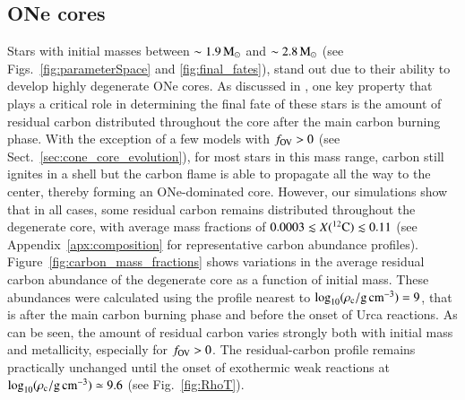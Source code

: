 \documentclass[main.tex]{subfiles}
\begin{document}
\subsection{ONe cores}\label{sec:one_core_evolution}
Stars with initial masses between $\sim 1.9\msun$ and $\sim  2.8\msun$ (see Figs.~\ref{fig:parameterSpace} and \ref{fig:final_fates}),  stand out due to their ability to develop highly degenerate ONe cores. As discussed in , one key property that  plays a critical role in determining the final fate of these stars is the amount of residual carbon distributed throughout the core  after the main carbon burning phase. 
With the exception of a few models with $f_{\rm OV}> 0$ (see Sect.~\ref{sec:cone_core_evolution}), for  most stars in this mass range, carbon still ignites  in a shell but the carbon flame
is able to propagate all the way to the center, thereby forming an ONe-dominated core. 
However, our simulations show that in all cases, some residual carbon remains
distributed throughout the degenerate core, with average mass fractions of $0.0003 \lesssim X(\iso{C}{12}) \lesssim 0.11$ (see Appendix~\ref{apx:composition} for representative carbon abundance profiles). 
Figure~\ref{fig:carbon_mass_fractions} shows variations in  the average residual carbon abundance of the degenerate core as a function of initial mass.
These abundances were calculated using the \mesa profile nearest to $\logrhoc=9$, that is after the main carbon burning phase and before the onset of Urca reactions. As can be seen, the amount of residual carbon varies strongly both with initial mass and metallicity, especially for $f_{\rm OV}>0$.  
 The residual-carbon profile remains practically unchanged until the  onset of exothermic weak reactions at $\logrhoc\simeq 9.6$ (see Fig.~\ref{fig:RhoT}).
\end{document}
